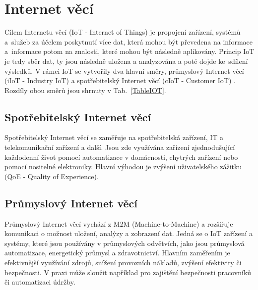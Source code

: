 \chapter{Internet věcí}
\label{ChapterInternetVeci}

Cílem Internetu věcí (IoT - Internet of Things) je propojení zařízení, systémů a~služeb za účelem poskytnutí více dat, která mohou být převedena na informace a~informace potom na znalosti, které mohou být následně aplikovány. Princip IoT je tedy sběr dat, ty jsou následně uložena a analyzována a poté dojde ke~sdílení výsledků. V rámci IoT se vytvořily dva hlavní směry, průmyslový Internet věcí (iIoT - Industry IoT) a spotřebitelský Internet věcí (cIoT - Customer IoT) \cite{iot_svet_hardware_internet_veci, iot_pohanka_internet_veci}. Rozdíly obou směrů jsou shrnuty v Tab.~\ref{TableIOT}.

\section{Spotřebitelský Internet věcí}
Spotřebitelský Internet věcí se zaměřuje na spotřebitelská zařízení, IT a telekomunikační zařízení a další. Jsou zde využívána zařízení zjednodušující každodenní život pomocí automatizace v domácnosti, chytrých zařízení nebo pomocí nositelné elektroniky. Hlavní výhodou je zvýšení uživatelského zážitku (QoE - Quality of Experience).

\section{Průmyslový Internet věcí}
Průmyslový Internet věcí vychází z M2M (Machine-to-Machine) a rozšiřuje komunikaci o možnost uložení, analýzy a zobrazení dat. Jedná se o IoT zařízení a systémy, které jsou používány v průmyslových odvětvích, jako jsou průmyslová automatizace, energetický průmysl a zdravotnictví. Hlavním zaměřením je efektivnější využívání zdrojů, snížení provozních nákladů, zvýšení efektivity či bezpečnosti. V praxi může sloužit například pro zajištění bezpečnosti pracovníků či automatizaci údržby. 


